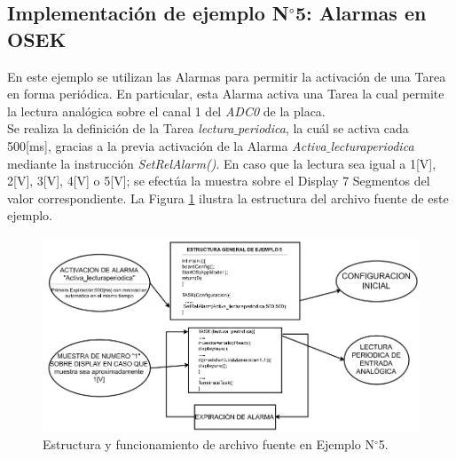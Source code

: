 \documentclass[12pt,letterpaper]{article}
\begin{document}
\subsection{Implementación de ejemplo N$^{\circ}$5: Alarmas en OSEK}
En este ejemplo se utilizan las Alarmas para permitir la activación de una Tarea en forma periódica. En particular, esta Alarma activa una Tarea la cual permite la lectura analógica sobre el canal 1 del \textit{ADC0} de la placa.
  \\
  
Se realiza la definición de la Tarea \textit{lectura$\_$periodica}, la cuál se activa cada 500[ms], gracias a la previa activación de la Alarma \textit{Activa$\_$lecturaperiodica} mediante la instrucción \textit{SetRelAlarm()}. En caso que la lectura sea igual a 1[V], 2[V], 3[V], 4[V] o 5[V]; se efectúa la muestra sobre el Display 7 Segmentos del valor correspondiente. La Figura \ref{estructuraej5} ilustra la estructura del archivo fuente de este ejemplo.
\begin{figure}[H]
\centering
\includegraphics[width=15 cm]{figuras/f36.png}
\caption{Estructura y funcionamiento de archivo fuente en Ejemplo N$^{\circ}$5.}
\label{estructuraej5}
\end{figure}
\end{document}
